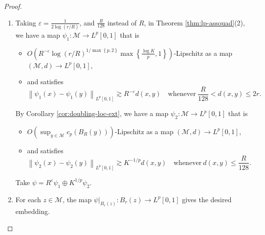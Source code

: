 \documentclass[11pt,reqno]{amsart}
\newcommand{\1}{\mathbf 1}
\begin{document}
\begin{proof}\,
\begin{enumerate}
\item
Taking $\varepsilon=\frac{1}{2\log\left(r/R\right)}$, and $\frac{R}{128}$ instead of $R$, in Theorem \ref{thm:lp-assouad}(2), we have a map $\psi_1:\mathcal{M}\to L^p[0,1]$ that is
    \begin{itemize}
    \item $O\left(R^{-\varepsilon}\log\left(r/R\right)^{1/\max\left\{p,2\right\}}\max\left\{\frac{\log K}{p},1\right\}\right)$-Lipschitz as a map $(\mathcal{M},d)\to L^p[0,1]$,
    \item and satisfies
\begin{equation}
\left\|\psi_1\left(x\right)-\psi_1\left(y\right)\right\|_{L^p[0,1]}\gtrsim R^{-\varepsilon}d\left(x,y\right) \quad \mathrm{whenever}~\frac{R}{128}<d\left(x,y\right)\le 2r.
\end{equation}
\end{itemize}
By Corollary \ref{cor:doubling-loc-ext}, we have a map $\psi_2:\mathcal{M}\to L^p[0,1]$ that is
    \begin{itemize}
    \item $O\left(\sup_{ y\in \mathcal{M}}c_p\left(B_{R}\left(y\right)\right)\right)$-Lipschitz as a map $(\mathcal{M},d)\to L^p[0,1]$,
    \item and satisfies
\begin{equation}
\left\|\psi_2\left(x\right)-\psi_2\left(y\right)\right\|_{L^p[0,1]}\gtrsim K^{-1/p}d\left(x,y\right) \quad \mathrm{whenever}~d\left(x,y\right)\le \frac{R}{128}.
\end{equation}
\end{itemize}
Take $\psi=R^\varepsilon \psi_1\oplus K^{1/p}\psi_2$.
\item For each $z\in \mathcal{M}$, the map $\left.\psi\right|_{B_r\left(z\right)}:B_r\left(z\right)\to L^p[0,1]$ gives the desired embedding.
\end{enumerate}
\end{proof}
\end{document}
